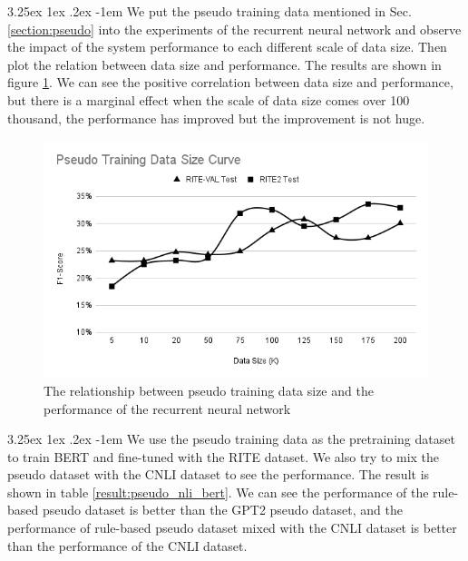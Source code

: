 \documentclass[12pt]{article}
\makeatletter
\renewcommand\paragraph{\@startsection{paragraph}{5}{\z@}%
  {3.25ex \@plus1ex \@minus.2ex}%
  {-1em}%
  {\normalfont\normalsize\bfseries}}
\makeatother
\begin{document}
\begin{CJK*}{UTF8}{bkai}
\begin{spacing}{1.77}
\paragraph{}
We put the pseudo training data mentioned in Sec. \ref{section:pseudo} into the experiments of the recurrent neural network and observe the impact of the system performance to each different scale of data size. Then plot the relation between data size and performance. The results are shown in figure \ref{fig:pseudo_datasize}. We can see the positive correlation between data size and performance, but there is a marginal effect when the scale of data size comes over 100 thousand, the performance has improved but the improvement is not huge.

\begin{figure}[H]
  \centering
  \includegraphics[width=15cm]{PseudoTrainingDataSizeCurve.png}
  \caption[Pseudo Training Data Size Curve]{The relationship between pseudo training data size and the performance of the recurrent neural network}
  \label{fig:pseudo_datasize}
\end{figure}

\paragraph{}
We use the pseudo training data as the pretraining dataset to train BERT and fine-tuned with the RITE dataset. We also try to mix the pseudo dataset with the CNLI dataset to see the performance. The result is shown in table \ref{result:pseudo_nli_bert}. We can see the performance of the rule-based pseudo dataset is better than the GPT2 pseudo dataset, and the performance of rule-based pseudo dataset mixed with the CNLI dataset is better than the performance of the CNLI dataset.


\end{spacing}
\end{CJK*}
\end{document}
